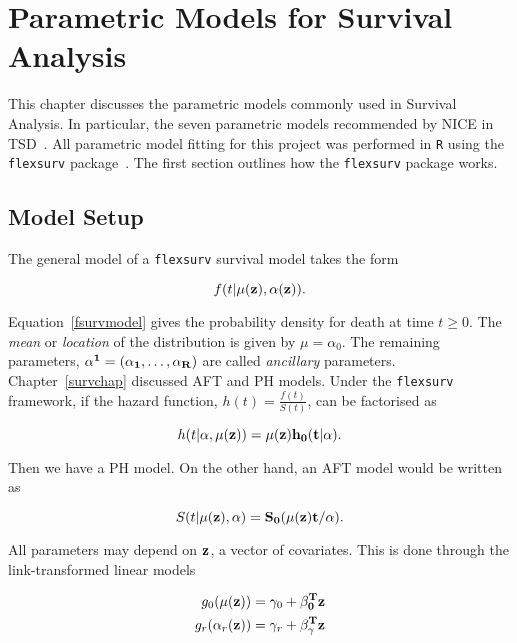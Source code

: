 \chapter{Parametric Models for Survival Analysis}

This chapter discusses the parametric models commonly used in Survival Analysis. In particular, the seven parametric models recommended by NICE in TSD~\cite{tsd14}. All parametric model fitting for this project was performed in \verb|R| using the \verb|flexsurv| package~\cite{flexsurv}. The first section outlines how the \verb|flexsurv| package works.

\section{Model Setup}
The general model of a \verb|flexsurv| survival model takes the form 

\begin{equation}
    \label{fsurvmodel}
    f(t|\mu(\bf{z}), \bf{\alpha}(\bf{z})).
\end{equation}

Equation~\ref{fsurvmodel} gives the probability density for death at time $t \geq 0$. The \textit{mean} or \textit{location} of the distribution is given by $\mu = \alpha_0$. The remaining parameters, $\bf{\alpha^1} = (\alpha_1, \ldots, \alpha_R)$ are called \textit{ancillary} parameters. \\

Chapter~\ref{survchap} discussed AFT and PH models. Under the \verb|flexsurv| framework, if the hazard function, $h(t) = \frac{f(t)}{S(t)}$, can be factorised as 

\[
    h(t|\bf{\alpha}, \mu(\bf{z})) = \mu(\bf{z})h_0(t|\bf{\alpha}). 
\] 

Then we have a PH model. On the other hand, an AFT model would be written as

\[
    S(t|\mu(\bf{z}), \bf{\alpha}) = S_0(\mu(\bf{z})t/\bf{\alpha}).  
\]

All parameters may depend on $\bf{z}$, a vector of covariates. This is done through the link-transformed linear models

\begin{align}
    \label{flexsurvMLE}
    g_0(\mu(\bf{z})) &= \gamma_0 + \bf{\beta}_0^Tz \nonumber \\
    g_r(\alpha_r(\bf{z})) &= \gamma_r + \bf{\beta}_{\gamma}^T\bf{z}
\end{align}

